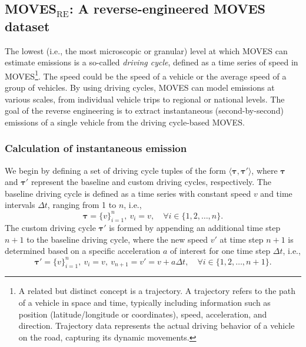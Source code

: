 \documentclass[12pt,english]{article}
\begin{document}
\subsection{MOVES$_\text{RE}$: A reverse-engineered MOVES dataset}


The lowest (i.e., the most microscopic or granular) level at which MOVES can estimate emissions is a so-called \textit{driving cycle}, defined as a time series of speed in MOVES\footnote{
A related but distinct concept is a trajectory. 
A trajectory refers to the path of a vehicle in space and time, typically including information such as position (latitude/longitude or coordinates), speed, acceleration, and direction. Trajectory data represents the actual driving behavior of a vehicle on the road, capturing its dynamic movements.}. 
The speed could be the speed of a vehicle or the average speed of a group of vehicles. By using driving cycles, MOVES can model emissions at various scales, from individual vehicle trips to regional or national levels.
The goal of the reverse engineering is to extract instantaneous (second-by-second) emissions of a single vehicle from the driving cycle-based MOVES.


\subsubsection{Calculation of instantaneous emission}


We begin by defining a set of driving cycle tuples of the form \( \langle \boldsymbol\tau, \boldsymbol\tau' \rangle \), where \( \boldsymbol\tau \) and \( \boldsymbol\tau' \) represent the baseline and custom driving cycles, respectively.
The baseline driving cycle is defined as a time series with constant speed \( v \) and time intervals \( \Delta t \), ranging from 1 to \( n \), i.e.,
\begin{equation}
    \boldsymbol{\tau} = \{ v \}_{i=1}^{n}, \ v_i=v, \quad \forall i \in \{1, 2, \dots, n\}.
\end{equation}
%
The custom driving cycle \( \boldsymbol{\tau'} \) is formed by appending an additional time step \( n+1 \) to the baseline driving cycle, where the new speed \( v' \) at time step \( n+1 \) is determined based on a specific acceleration \( a \) of interest for one time step \( \Delta t \), i.e.,
\begin{equation}
    \boldsymbol{\tau'} = \{ v \}_{i=1}^{n}, \ v_i = v, \ v_{n+1}= v' = v + a \Delta t, \quad \forall i \in \{1, 2, \dots, n+1\}.
\end{equation}
\end{document}
